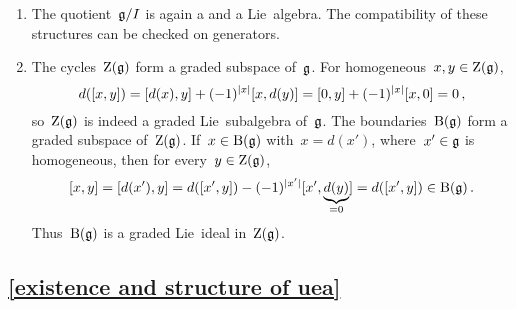 \begin{enumerate}
  \item
    The quotient~$\mathfrak{g}/I$ is again a {\dgvs} and a Lie~algebra.
    The compatibility of these structures can be checked on generators.
  \item
    The cycles~$\operatorname{Z}(\mathfrak{g})$ form a graded subspace of~$\mathfrak{g}$.
    For homogeneous~$x, y \in \operatorname{Z}(\mathfrak{g})$,
    \[
      d([x,y])
      =
      [d(x), y] + (-1)^{\lvert x\rvert} [x, d(y)]
      =
      [0, y] + (-1)^{\lvert x\rvert} [x, 0]
      =
      0 \,,
    \]
    so~$\operatorname{Z}(\mathfrak{g})$ is indeed a graded Lie~subalgebra of~$\mathfrak{g}$.
    The boundaries~$\operatorname{B}(\mathfrak{g})$ form a graded subspace of~$\operatorname{Z}(\mathfrak{g})$.
    If~$x \in \operatorname{B}(\mathfrak{g})$ with~$x = d(x')$, where~$x' \in \mathfrak{g}$ is homogeneous, then for every~$y \in \operatorname{Z}(\mathfrak{g})$,
    \[
      [x,y]
      =
      [d(x'), y]
      =
      d([x',y]) - (-1)^{\lvert x'\rvert} [x', \underbrace{d(y)}_{=0}]
      =
      d([x',y])
      \in
      \operatorname{B}(\mathfrak{g}) \,.
    \]
    Thus~$\operatorname{B}(\mathfrak{g})$ is a graded Lie~ideal in~$\operatorname{Z}(\mathfrak{g})$.
\end{enumerate}



\subsection{\cref{existence and structure of uea}}
\label{existence and structure of uea proof}

